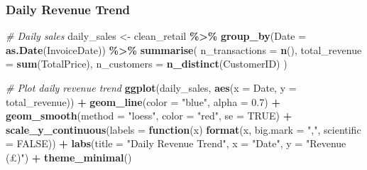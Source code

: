 \documentclass[
]{article}
\newenvironment{Shaded}{\begin{snugshade}}{\end{snugshade}}
\newcommand{\AttributeTok}[1]{\textcolor[rgb]{0.13,0.29,0.53}{#1}}
\newcommand{\CommentTok}[1]{\textcolor[rgb]{0.56,0.35,0.01}{\textit{#1}}}
\newcommand{\ConstantTok}[1]{\textcolor[rgb]{0.56,0.35,0.01}{#1}}
\newcommand{\ControlFlowTok}[1]{\textcolor[rgb]{0.13,0.29,0.53}{\textbf{#1}}}
\newcommand{\FloatTok}[1]{\textcolor[rgb]{0.00,0.00,0.81}{#1}}
\newcommand{\FunctionTok}[1]{\textcolor[rgb]{0.13,0.29,0.53}{\textbf{#1}}}
\newcommand{\NormalTok}[1]{#1}
\newcommand{\OtherTok}[1]{\textcolor[rgb]{0.56,0.35,0.01}{#1}}
\newcommand{\SpecialCharTok}[1]{\textcolor[rgb]{0.81,0.36,0.00}{\textbf{#1}}}
\newcommand{\StringTok}[1]{\textcolor[rgb]{0.31,0.60,0.02}{#1}}
\begin{document}
\newpage

\subsubsection{Daily Revenue Trend}\label{daily-revenue-trend}

\begin{Shaded}
\begin{Highlighting}[]
\CommentTok{\# Daily sales}
\NormalTok{daily\_sales }\OtherTok{\textless{}{-}}\NormalTok{ clean\_retail }\SpecialCharTok{\%\textgreater{}\%}
  \FunctionTok{group\_by}\NormalTok{(}\AttributeTok{Date =} \FunctionTok{as.Date}\NormalTok{(InvoiceDate)) }\SpecialCharTok{\%\textgreater{}\%}
  \FunctionTok{summarise}\NormalTok{(}
    \AttributeTok{n\_transactions =} \FunctionTok{n}\NormalTok{(),}
    \AttributeTok{total\_revenue =} \FunctionTok{sum}\NormalTok{(TotalPrice),}
    \AttributeTok{n\_customers =} \FunctionTok{n\_distinct}\NormalTok{(CustomerID)}
\NormalTok{  )}

\CommentTok{\# Plot daily revenue trend}
\FunctionTok{ggplot}\NormalTok{(daily\_sales, }\FunctionTok{aes}\NormalTok{(}\AttributeTok{x =}\NormalTok{ Date, }\AttributeTok{y =}\NormalTok{ total\_revenue)) }\SpecialCharTok{+}
  \FunctionTok{geom\_line}\NormalTok{(}\AttributeTok{color =} \StringTok{"blue"}\NormalTok{, }\AttributeTok{alpha =} \FloatTok{0.7}\NormalTok{) }\SpecialCharTok{+}
  \FunctionTok{geom\_smooth}\NormalTok{(}\AttributeTok{method =} \StringTok{"loess"}\NormalTok{, }\AttributeTok{color =} \StringTok{"red"}\NormalTok{, }\AttributeTok{se =} \ConstantTok{TRUE}\NormalTok{) }\SpecialCharTok{+}
  \FunctionTok{scale\_y\_continuous}\NormalTok{(}\AttributeTok{labels =} \ControlFlowTok{function}\NormalTok{(x) }\FunctionTok{format}\NormalTok{(x, }\AttributeTok{big.mark =} \StringTok{","}\NormalTok{, }\AttributeTok{scientific =} \ConstantTok{FALSE}\NormalTok{)) }\SpecialCharTok{+}
  \FunctionTok{labs}\NormalTok{(}\AttributeTok{title =} \StringTok{"Daily Revenue Trend"}\NormalTok{, }\AttributeTok{x =} \StringTok{"Date"}\NormalTok{, }\AttributeTok{y =} \StringTok{"Revenue (£)"}\NormalTok{) }\SpecialCharTok{+}
  \FunctionTok{theme\_minimal}\NormalTok{()}
\end{Highlighting}
\end{Shaded}
\end{document}
